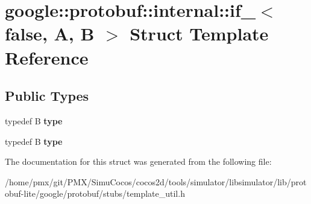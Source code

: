 \hypertarget{structgoogle_1_1protobuf_1_1internal_1_1if___3_01false_00_01A_00_01B_01_4}{}\section{google\+:\+:protobuf\+:\+:internal\+:\+:if\+\_\+$<$ false, A, B $>$ Struct Template Reference}
\label{structgoogle_1_1protobuf_1_1internal_1_1if___3_01false_00_01A_00_01B_01_4}
\subsection*{Public Types}
\begin{DoxyCompactItemize}
\item 
\mbox{\label{structgoogle_1_1protobuf_1_1internal_1_1if___3_01false_00_01A_00_01B_01_4_ae21aeb82ed1e4cf565895edb39a2b783}} 
typedef B {\bfseries type}
\item 
\mbox{\label{structgoogle_1_1protobuf_1_1internal_1_1if___3_01false_00_01A_00_01B_01_4_ae21aeb82ed1e4cf565895edb39a2b783}} 
typedef B {\bfseries type}
\end{DoxyCompactItemize}


The documentation for this struct was generated from the following file\+:\begin{DoxyCompactItemize}
\item 
/home/pmx/git/\+P\+M\+X/\+Simu\+Cocos/cocos2d/tools/simulator/libsimulator/lib/protobuf-\/lite/google/protobuf/stubs/template\+\_\+util.\+h\end{DoxyCompactItemize}
